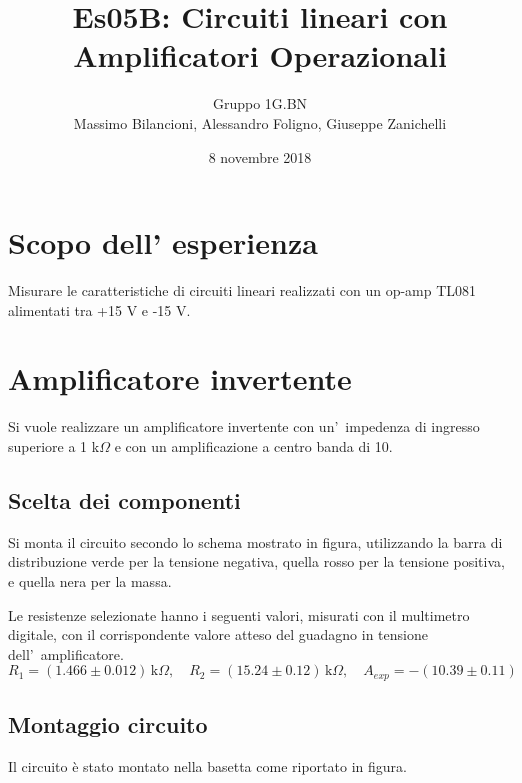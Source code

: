 \documentclass[10pt,a4paper]{article}
\author{Gruppo 1G.BN \\ Massimo Bilancioni, Alessandro Foligno, Giuseppe Zanichelli }
\title{Es05B: Circuiti lineari con Amplificatori Operazionali}
\begin{document}
	\date{8 novembre 2018}
	\maketitle
	
	
	\section*{Scopo dell' esperienza}
	Misurare le caratteristiche di circuiti lineari realizzati con un op-amp TL081 alimentati tra +15 V e -15 V.
	
	\section{Amplificatore invertente}
	Si vuole realizzare un amplificatore invertente con un'~impedenza di ingresso superiore a 1 
	k$\Omega$ e con un amplificazione a centro banda di 10.
	
	\subsection{Scelta dei componenti}
	
	Si monta il circuito secondo lo schema mostrato in figura, utilizzando la barra di 
	distribuzione verde per la tensione negativa, quella rosso per la tensione positiva, e quella nera per 
	la massa.
	


	
	Le resistenze selezionate hanno i seguenti valori, misurati con il multimetro digitale, con il corrispondente valore atteso 
	del guadagno in tensione dell'~amplificatore.
	\[
	R_1 = ( 1.466 \pm 0.012) \,\mathrm{k}\Omega, \quad 
	R_2 = (15.24  \pm 0.12) \,\mathrm{k}\Omega, \quad 
	A_{exp} = -(10.39 \pm 0.11)
	\]
	
	\subsection{Montaggio circuito}
	Il circuito è stato montato nella basetta come riportato in figura.
\end{document}
